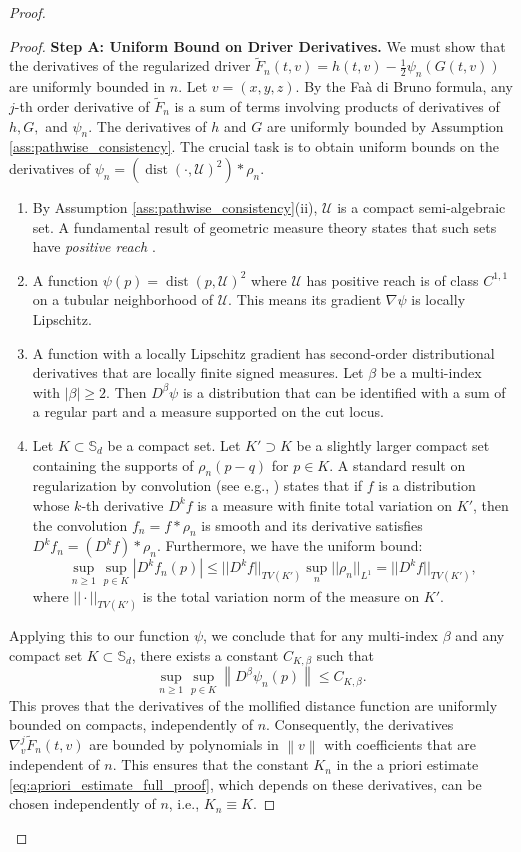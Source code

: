 \documentclass[12pt, letterpaper]{amsart}
\newcommand{\Ucal}{\mathcal{U}}
\newcommand{\Sd}{\mathbb{S}_d}
\newcommand{\norm}[1]{\left\lVert#1\right\rVert}
\DeclareMathOperator*{\dist}{dist}
\theoremstyle{plain}
\theoremstyle{definition}
\theoremstyle{remark}
\numberwithin{equation}{section} %
\begin{document}
\begin{proof}
\begin{proof}
\vspace{1em}
\noindent\textbf{Step A: Uniform Bound on Driver Derivatives.}
We must show that the derivatives of the regularized driver \(\tilde{F}_n(t,v) = h(t,v) - \frac{1}{2}\psi_n(G(t,v))\) are uniformly bounded in \(n\). Let \(v = (x,y,z)\). By the Faà di Bruno formula, any \(j\)-th order derivative of \(\tilde{F}_n\) is a sum of terms involving products of derivatives of \(h, G,\) and \(\psi_n\). The derivatives of \(h\) and \(G\) are uniformly bounded by Assumption \ref{ass:pathwise_consistency}. The crucial task is to obtain uniform bounds on the derivatives of \(\psi_n = (\dist(\cdot, \Ucal)^2) * \rho_n\).
\begin{enumerate}
    \item By Assumption \ref{ass:pathwise_consistency}(ii), \(\Ucal\) is a compact semi-algebraic set. A fundamental result of geometric measure theory states that such sets have \emph{positive reach} \cite{Federer1959}.
    \item A function \(\psi(p) = \dist(p,\Ucal)^2\) where \(\Ucal\) has positive reach is of class \(C^{1,1}\) on a tubular neighborhood of \(\Ucal\). This means its gradient \(\nabla\psi\) is locally Lipschitz.
    \item A function with a locally Lipschitz gradient has second-order distributional derivatives that are locally finite signed measures. Let \(\beta\) be a multi-index with \(|\beta| \ge 2\). Then \(D^\beta \psi\) is a distribution that can be identified with a sum of a regular part and a measure supported on the cut locus.
    \item Let \(K \subset \Sd\) be a compact set. Let \(K' \supset K\) be a slightly larger compact set containing the supports of \(\rho_n(p-q)\) for \(p \in K\). A standard result on regularization by convolution (see e.g., \cite[Appendix C.4]{Evans2010}) states that if \(f\) is a distribution whose \(k\)-th derivative \(D^k f\) is a measure with finite total variation on \(K'\), then the convolution \(f_n = f*\rho_n\) is smooth and its derivative satisfies \(D^k f_n = (D^k f) * \rho_n\). Furthermore, we have the uniform bound:
    \[ \sup_{n\ge 1} \sup_{p \in K} |D^k f_n(p)| \le ||D^k f||_{TV(K')} \sup_n ||\rho_n||_{L^1} = ||D^k f||_{TV(K')}, \]
    where \(||\cdot||_{TV(K')}\) is the total variation norm of the measure on \(K'\).
\end{enumerate}
Applying this to our function \(\psi\), we conclude that for any multi-index \(\beta\) and any compact set \(K \subset \Sd\), there exists a constant \(C_{K,\beta}\) such that
\[ \sup_{n \ge 1} \sup_{p \in K} \norm{D^\beta \psi_n(p)} \le C_{K,\beta}. \]
This proves that the derivatives of the mollified distance function are uniformly bounded on compacts, independently of \(n\). Consequently, the derivatives \(\nabla_v^j \tilde{F}_n(t, v)\) are bounded by polynomials in \(\norm{v}\) with coefficients that are independent of \(n\). This ensures that the constant \(K_n\) in the a priori estimate \eqref{eq:apriori_estimate_full_proof}, which depends on these derivatives, can be chosen independently of \(n\), i.e., \(K_n \equiv K\).


\end{proof}
\end{proof}
\end{document}
